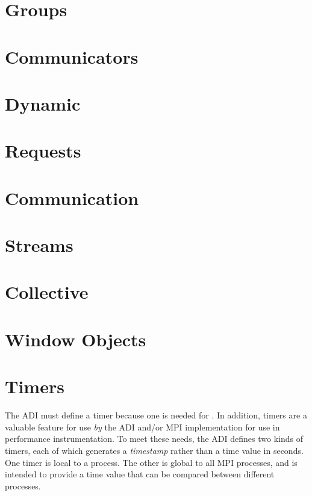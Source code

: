 \documentclass{article}
\begin{document}
\section{Groups}



\section{Communicators}


\section{Dynamic}


\section{Requests}


\section{Communication}



\section{Streams}



\section{Collective}
%


\section{Window Objects}
\label{sec:window-objects}


\section{Timers}
\label{sec:timers}
The ADI must define a timer because one is needed for .  In
addition, timers are a valuable feature for use \emph{by} the ADI and/or MPI
implementation for use in performance instrumentation.  To meet these needs,
the ADI defines two kinds of timers, each of which generates a
\emph{timestamp} rather than a time value in seconds.  
One timer is local to a process. The other is global to all MPI processes, and
is intended to provide a time value that can be compared between different
processes.  
\end{document}
